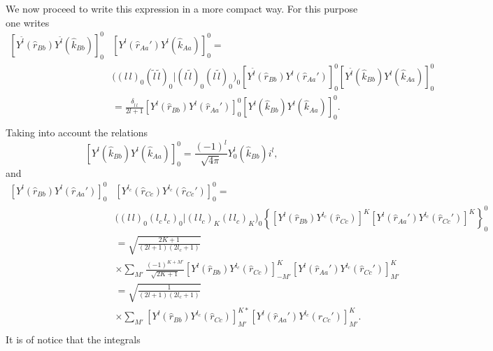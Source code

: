 We now proceed to write this expression in a more compact way. 
For this purpose one writes
\begin{equation}\label{eq24}
 \begin{split}
\left[ Y ^{\tilde l} (\hat r_{Bb}) Y ^{\tilde l} (\hat k_{Bb})  \right]_{0}^{0}&
\left[ Y ^{ l} (\hat r_{Aa}') Y ^{l} (\hat k_{Aa}) \right] _{0}^{0}=\\
& \bigl ( (l \, l)_0 (\tilde l \, \tilde l)_0 |(l \, \tilde l)_0 (l \, \tilde l)_0 \bigr )_0
\left[ Y ^{\tilde l} (\hat r_{Bb}) Y ^{ l} (\hat r_{Aa}') \right] _{0}^{0}
\left[ Y ^{ \tilde l} (\hat k_{Bb}) Y ^{l} (\hat k_{Aa}) \right] _{0}^{0}\\
& =\frac{\delta_{\tilde l \, l}}{2l+1}
\left[ Y ^{l} (\hat r_{Bb}) Y ^{ l} (\hat r_{Aa}') \right] _{0}^{0}
\left[ Y ^{l} (\hat k_{Bb}) Y ^{l} (\hat k_{Aa}) \right] _{0}^{0}.\\
 \end{split}
\end{equation}
Taking into account the relations
\begin{equation}\label{eq25}
\left[ Y ^{l} (\hat k_{Bb}) Y ^{l} (\hat k_{Aa}) \right] _{0}^{0}=\frac{(-1)^l}{\sqrt{4 \pi}} Y_0^l(\hat k_{Bb}) i^l,
\end{equation}
and
\begin{equation}\label{eq26}
 \begin{split}
\left[ Y ^{l} (\hat r_{Bb}) Y ^{ l} (\hat r_{Aa}') \right] _{0}^{0}&
\left[ Y ^{l_c} (\hat r_{Cc}) Y ^{l_c} (\hat r_{Cc}') \right] _{0}^{0}=\\
& \bigl ( (l \, l)_0 (l_c \,  l_c)_0 |(l \,l_c)_K (l \, l_c)_K \bigr )_0 \left\lbrace
\left[Y^{l} (\hat r_{Bb}) Y ^{l_c} (\hat r_{Cc}) \right]^{K}
\left[Y^{l} (\hat r_{Aa}') Y ^{l_c} (\hat r_{Cc}') \right]^{K}\right\rbrace _0^0\\
& = \sqrt{\frac{2K+1}{(2l+1)(2l_c+1)}}\\
& \times \sum_{M'} \frac{(-1)^{K+M'}}{\sqrt{2K+1}}
\left[Y^{l} (\hat r_{Bb}) Y ^{l_c} (\hat r_{Cc}) \right]^{K}_{-M'} \left[Y^{l} (\hat r_{Aa}') Y ^{l_c} (\hat r_{Cc}') \right]^{K}_{M'}\\
& = \sqrt{\frac{1}{(2l+1)(2l_c+1)}}\\
& \times \sum_{M'}
\left[Y^{l} (\hat r_{Bb}) Y ^{l_c} (\hat r_{Cc}) \right]^{K*}_{M'} \left[Y^{l} (\hat r_{Aa}') Y ^{l_c} (\hat r_{Cc}') \right]^{K}_{M'}.\\
 \end{split}
\end{equation}
It is of notice that the integrals
